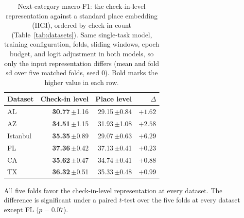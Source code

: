 %
\providecommand{\sd}[1]{\,{\scriptsize$\pm$#1}}
\begin{table}[!t]
\caption{Next-category macro-F1: the check-in-level representation against a standard place
embedding (HGI), ordered by check-in count (Table~\ref{tab:datasets}). Same single-task model,
training configuration, folds, sliding windows, epoch budget, and logit adjustment in both models,
so only the input representation differs (mean and fold sd over five matched folds, seed 0). Bold marks
the higher value in each row.}
\label{tab:substrate}
\centering
\begin{tabular}{l r r r}
\hline
\textbf{Dataset} & \textbf{Check-in level} & \textbf{Place level} & \textbf{$\Delta$} \\
\hline
AL & \textbf{30.77}\sd{1.16} & 29.15\sd{0.84} & $+1.62$ \\
AZ & \textbf{34.51}\sd{1.15} & 31.93\sd{1.08} & $+2.58$ \\
Istanbul & \textbf{35.35}\sd{0.89} & 29.07\sd{0.63} & $+6.29$ \\
FL & \textbf{37.36}\sd{0.42} & 37.13\sd{0.41} & $+0.23$ \\
CA & \textbf{35.62}\sd{0.47} & 34.74\sd{0.41} & $+0.88$ \\
TX & \textbf{36.32}\sd{0.51} & 35.33\sd{0.48} & $+0.99$ \\
\hline
\end{tabular}

\vspace{2pt}
{\footnotesize All five folds favor the check-in-level representation at every dataset. The
difference is significant under a paired $t$-test over the five folds at every dataset except FL ($p=0.07$).}
\end{table}
